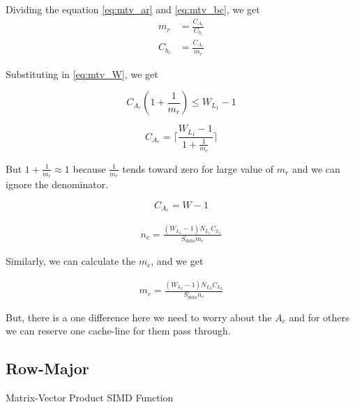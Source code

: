 Dividing the equation \ref{eq:mtv_ar} and \ref{eq:mtv_bc}, we get
\begin{align*}
    m_r &= \frac{C_{A_r}}{C_{b_c}}\\
    C_{b_c} &= \frac{C_{A_r}}{m_r}
\end{align*}

Substituting in \ref{eq:mtv_W}, we get

\[
    C_{A_r}(1 + \frac{1}{m_r}) \leq W_{L_1} - 1
\]

\[
    C_{A_r} = \lceil \frac{W_{L_1} - 1}{1 + \frac{1}{m_r}} \rceil
\]

But $1 + \frac{1}{m_r} \approx 1$ because $\frac{1}{m_r}$ tends toward zero for large value of $m_r$ 
and we can ignore the denominator.

\begin{equation}
    C_{A_r} = W - 1
    \label{eq:mtv_car}
\end{equation}

\begin{align*}
    n_c = \frac{ (W_{L_1} - 1) N_{L_1}C_{L_1} }{S_{data} m_r }
\end{align*}

Similarly, we can calculate the $m_c$, and we get

\begin{align*}
    m_c = \frac{ (W_{L_2} - 1) N_{L_2}C_{L_2} }{S_{data} n_c }
\end{align*}

But, there is a one difference here we need to worry about the $A_c$ and for others 
we can reserve one cache-line for them pass through.

\clearpage
\subsection{Row-Major}

\begin{algorithm}[H]
    \SetAlgoLined

    \caption{Matrix-Vector Product SIMD Function}
\end{algorithm}

